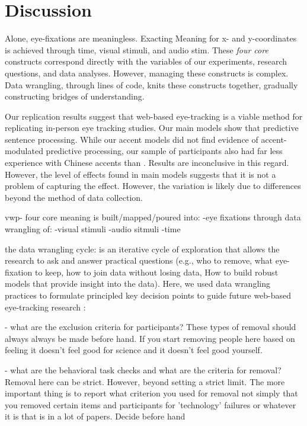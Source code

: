 \section{Discussion}
Alone, eye-fixations are meaningless. Exacting Meaning for x- and y-coordinates is achieved
through time, visual stimuli, and audio stim. These \textit{four core} constructs correspond directly with the variables of our experiments, research questions, and data analyses. However, managing these constructs is complex. Data wrangling, through lines of code, knits these constructs together, gradually constructing bridges of understanding.

Our replication results suggest that web-based eye-tracking is a viable method for replicating in-person eye tracking studies. Our main models show that predictive sentence processing. While our accent models did not find evidence of accent-modulated predictive processing, our sample of participants also had far less experience with Chinese accents than \textcite{Porretta_et_al_2020}. Results are inconclusive in this regard. However, the level of effects found in main models suggests that it is not a problem of capturing the effect. However, the variation is likely due to differences beyond the method of data collection.


vwp- four core
meaning is built/mapped/poured into:
-eye fixations
through data wrangling of:
-visual stimuli
-audio sitmuli
-time


the data wrangling cycle: is an iterative cycle of exploration that allows the research to ask and answer practical questions (e.g., who to remove, what eye-fixation to keep, how to join data without losing data, How to build robust models that provide insight into the data). Here, we used data wrangling practices to formulate principled key decision points to guide future web-based eye-tracking research :

- what are the exclusion criteria for participants?
These types of removal should always always be made before hand. If you start removing people here based on feeling it doesn't feel good for science and it doesn't feel good yourself. 


- what are the behavioral task checks and what are the criteria for removal?
Removal here can be strict. However, beyond setting a strict limit. The more important thing is to report what criterion you used for removal not simply that you removed certain items and participants for 'technology' failures or whatever it is that is in a lot of papers. Decide before hand


